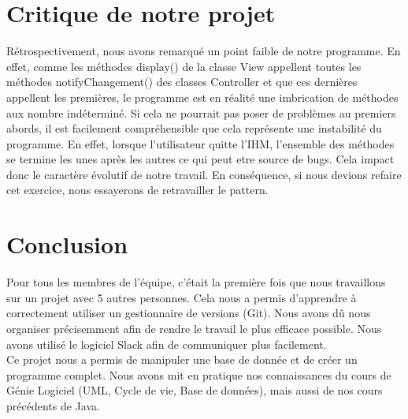 \documentclass{article}
\begin{document}
\begin{flushleft}
\section{Critique de notre projet}
Rétrospectivement, nous avons remarqué un point faible de notre programme.
En effet, comme les méthodes display() de la classe View appellent toutes
les méthodes notifyChangement() des classes Controller et que ces dernières
appellent les premières, le programme est en réalité une imbrication de
méthodes aux nombre indéterminé. Si cela ne pourrait pas poser de problèmes
au premiers abords, il est facilement compréhensible que cela représente une
instabilité du programme. En effet, lorsque l’utilisateur quitte l’IHM,
l’ensemble des méthodes se termine les unes après les autres ce qui peut
etre source de bugs. Cela impact donc le caractère évolutif de notre travail.
En conséquence, si nous devions refaire cet exercice, nous essayerons de
retravailler le pattern.



\section{Conclusion}
Pour tous les membres de l'équipe, c'était la première fois que nous
travaillons sur un projet avec 5 autres personnes. Cela nous a permis
d'apprendre à correctement utiliser un gestionnaire de versions (Git). Nous
avons dû nous organiser précisemment afin de rendre le travail le plus efficace
possible. Nous avons utilisé le logiciel Slack afin de communiquer plus
facilement. \\
Ce projet nous a permis de manipuler une base de donnée et de créer un
programme complet. Nous avons mit en pratique nos connaissances du cours
de Génie Logiciel (UML, Cycle de vie, Base de données), mais aussi de nos cours
précédents de Java. 





\end{flushleft}
\end{document}
